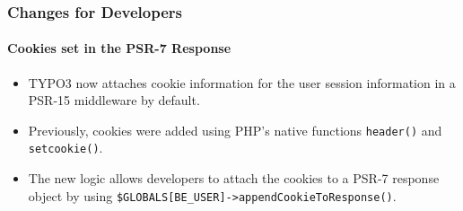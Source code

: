 %

\begin{frame}[fragile]
	\frametitle{Changes for Developers}
	\framesubtitle{Cookies set in the PSR-7 Response}

	\begin{itemize}
		\item TYPO3 now attaches cookie information for the user session information
			in a PSR-15 middleware by default.
		\item Previously, cookies were added using PHP's native functions
			\small\texttt{header()} and \texttt{setcookie()}\normalsize.
		\item The new logic allows developers to attach the cookies to a PSR-7
			response object by using\newline
			\small\texttt{\$GLOBALS[BE\_USER]->appendCookieToResponse()}\normalsize.
	\end{itemize}
\end{frame}

